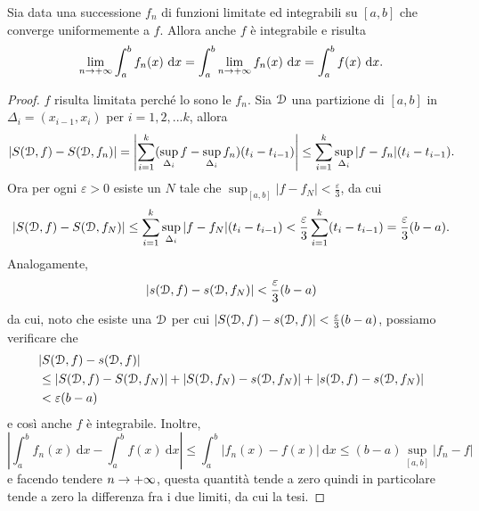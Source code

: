 \documentclass[Completo.tex]{subfiles}
\begin{document}
\begin{eTh}
	Sia data una successione $f_n$ di funzioni limitate ed integrabili su $[a,b]$ che converge uniformemente a $f$. Allora anche $f$ è integrabile e risulta
	\begin{equation*}
	\lim_{n \ra +\infty} \int_{a}^{b} f_n(x) \ \mathrm{d}x = \int_{a}^{b} \lim_{n \ra +\infty} f_n(x) \ \mathrm{d}x = \int_{a}^{b} f(x) \ \mathrm{d}x.
	\end{equation*}
\end{eTh}
\begin{proof}
	$f$ risulta limitata perché lo sono le $f_n$. Sia $\eu[D]$ una partizione di $[a,b]$ in $\Delta_i = (x_{i-1}, x_i)$ per $i = 1, 2, ... k$, allora
	\begin{equation*}
		\vert S(\eu[D], f) - S(\eu[D], f_n) \vert = \left\vert \sum_{i = 1}^{k} (\sup_{\Delta_i} f - \sup_{\Delta_i} f_n)(t_i - t_{i-1})\right\vert \leq \sum_{i = 1}^{k} \sup_{\Delta_i} \vert f-f_n \vert (t_i - t_{i-1}).
	\end{equation*}
	Ora per ogni $\varepsilon > 0$ esiste un $N$ tale che $\sup_{[a,b]} \vert f-f_N \vert < \frac{\varepsilon}{3}$, da cui
	\begin{equation*}
	\vert S(\eu[D], f) - S(\eu[D], f_N) \vert \leq \sum_{i = 1}^{k} \sup_{\Delta_i} \vert f-f_N \vert (t_i - t_{i-1}) < \frac{\varepsilon}{3} \sum_{i = 1}^{k} (t_i - t_{i-1}) = \frac{\varepsilon}{3}(b-a).
	\end{equation*}
	Analogamente,
	\begin{equation*}
	\vert s(\eu[D], f) - s(\eu[D], f_N) \vert < \frac{\varepsilon}{3} (b-a)
	\end{equation*}
	da cui, noto che esiste una $\eu[D]$ per cui $\vert S(\eu[D], f) - s(\eu[D], f) \vert < \frac{\varepsilon}{3}(b-a)$, possiamo verificare che
	\begin{align*}
	& \vert S(\eu[D], f) - s(\eu[D], f) \vert \\
	& \leq \vert S(\eu[D], f) - S(\eu[D], f_N) \vert + \vert S(\eu[D], f_N) - s(\eu[D], f_N) \vert + \vert s(\eu[D], f) - s(\eu[D], f_N) \vert \\
	& < \varepsilon (b-a)
	\end{align*}
	e così anche $f$ è integrabile. Inoltre,
	\begin{equation*}
	\left\vert \int_{a}^{b} f_n(x) \ \mathrm{d}x - \int_{a}^{b} f(x) \ \mathrm{d}x \right\vert \leq \int_{a}^{b} \vert f_n(x) - f(x) \vert \ \mathrm{d}x \leq (b-a) \sup_{[a,b]} \vert f_n - f \vert
	\end{equation*}
	e facendo tendere $n \rightarrow +\infty$, questa quantità tende a zero quindi in particolare tende a zero la differenza fra i due limiti, da cui la tesi.
\end{proof}
\end{document}
